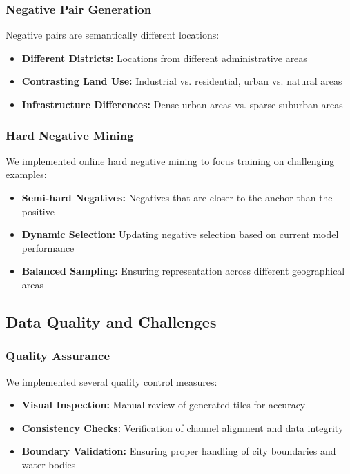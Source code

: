 \subsubsection{Negative Pair Generation}
Negative pairs are semantically different locations:
\begin{itemize}
    \item \textbf{Different Districts:} Locations from different administrative areas
    \item \textbf{Contrasting Land Use:} Industrial vs. residential, urban vs. natural areas
    \item \textbf{Infrastructure Differences:} Dense urban areas vs. sparse suburban areas
\end{itemize}

\subsubsection{Hard Negative Mining}
We implemented online hard negative mining to focus training on challenging examples:
\begin{itemize}
    \item \textbf{Semi-hard Negatives:} Negatives that are closer to the anchor than the positive
    \item \textbf{Dynamic Selection:} Updating negative selection based on current model performance
    \item \textbf{Balanced Sampling:} Ensuring representation across different geographical areas
\end{itemize}

\subsection{Data Quality and Challenges}

\subsubsection{Quality Assurance}
We implemented several quality control measures:
\begin{itemize}
    \item \textbf{Visual Inspection:} Manual review of generated tiles for accuracy
    \item \textbf{Consistency Checks:} Verification of channel alignment and data integrity
    \item \textbf{Boundary Validation:} Ensuring proper handling of city boundaries and water bodies
\end{itemize}

